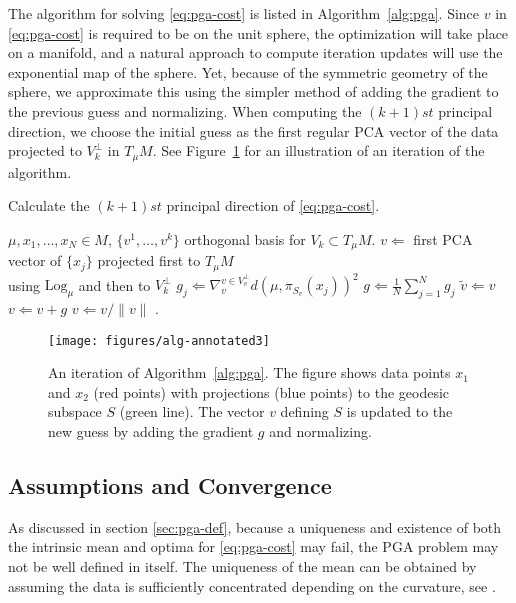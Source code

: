 \documentclass[final]{svjour3}
\newcommand{\Log}{\mathrm{Log}}
\begin{document}
The algorithm for solving \eqref{eq:pga-cost}
is listed in Algorithm~\ref{alg:pga}. 
Since $v$ in \eqref{eq:pga-cost} is required to be on the unit sphere, 
the optimization will take place on a manifold,
and a natural approach to compute iteration updates will use the exponential
map of the sphere. Yet, because of the symmetric geometry of the sphere, we 
approximate this using the simpler method
of adding the gradient to the previous guess and normalizing.
When computing the $(k+1)st$ principal direction, we 
choose the initial guess as the first regular PCA vector of the data projected
to $V_k^\perp$ in $T_\mu M$. See Figure~\ref{fig:alg} for
an illustration of an iteration of the algorithm.
\begin{algorithm}
    \caption{Calculate the $(k+1)st$ principal direction of \eqref{eq:pga-cost}.}
\label{alg:pga}
\begin{algorithmic}
    \REQUIRE $\mu,x_1,\ldots,x_N\in M$, $\{v^1,\ldots,v^k\}$ orthogonal basis for
    $V_k\subset T_\mu M$.
  \STATE $v \Leftarrow $ first PCA vector of $\{x_j\}$ projected first to
  $T_\mu M$\\\hspace{2.1em}using $\Log_\mu$ and then to $V_k^\perp$
  \REPEAT 
  \STATE $g_j \Leftarrow \nabla_{v}^{v\in V_{v}^\perp}d(\mu,\pi_{S_v}(x_j))^2$
    \STATE $g \Leftarrow \frac{1}{N}\sum_{j=1}^N g_j
$ 
  \STATE $\tilde{v} \Leftarrow v$ 
  \STATE $v \Leftarrow v+g$ 
  \STATE $v \Leftarrow v/\|v\|$ 
  .
\end{algorithmic}
\end{algorithm}
\begin{figure}[h]
    \begin{center}
      \texttt{[image: figures/alg-annotated3]}
    \end{center}
    \caption{An iteration of Algorithm~\ref{alg:pga}. The figure shows data points $x_1$ and
    $x_2$ (red points) with projections (blue points) to the geodesic subspace $S$ (green
    line). The vector $v$ defining $S$ is updated to the new guess by adding the
  gradient $g$ and normalizing.}
    \label{fig:alg}
\end{figure}

\subsection{Assumptions and Convergence}
As discussed in section \ref{sec:pga-def}, because a uniqueness and existence of
both the intrinsic mean and optima for \eqref{eq:pga-cost} may fail, the PGA
problem may not be well defined in itself. The uniqueness of the mean can be
obtained by assuming the data is sufficiently concentrated depending on the
curvature, see \cite{karcher_riemannian_1977}.
\end{document}

